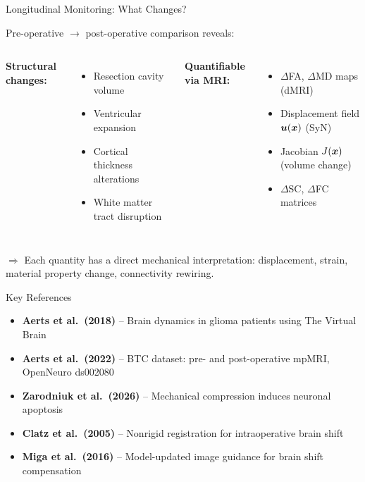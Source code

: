 \begin{frame}{Longitudinal Monitoring: What Changes?}

  Pre-operative $\to$ post-operative comparison reveals:

  \bigskip

  \begin{columns}[T]
    \textbf{Structural changes:}
    \begin{itemize}
      \item Resection cavity volume
      \item Ventricular expansion
      \item Cortical thickness alterations
      \item White matter tract disruption
    \end{itemize}

    \textbf{Quantifiable via MRI:}
    \begin{itemize}
      \item $\Delta$FA, $\Delta$MD maps (dMRI)
      \item Displacement field $\bm{u}(\bm{x})$ (SyN)
      \item Jacobian $J(\bm{x})$ (volume change)
      \item $\Delta$SC, $\Delta$FC matrices
    \end{itemize}
  \end{columns}

  \bigskip

  \alert{$\Rightarrow$} Each quantity has a direct mechanical
  interpretation: displacement, strain, material property change,
  connectivity rewiring.

\end{frame}

\begin{frame}{Key References}

  \begin{itemize}
    \item \textbf{Aerts et al.\ (2018)} \cite{Aerts2018} --
      Brain dynamics in glioma patients using The Virtual Brain
    \item \textbf{Aerts et al.\ (2022)} \cite{Aerts2022} --
      BTC dataset: pre- and post-operative mpMRI, OpenNeuro ds002080
    \item \textbf{Zarodniuk et al.\ (2026)} \cite{Zarodniuk2026} --
      Mechanical compression induces neuronal apoptosis
    \item \textbf{Clatz et al.\ (2005)} \cite{Clatz2005} --
      Nonrigid registration for intraoperative brain shift
    \item \textbf{Miga et al.\ (2016)} \cite{Miga2016} --
      Model-updated image guidance for brain shift compensation
  \end{itemize}

\end{frame}
